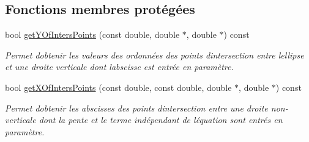 \subsection*{Fonctions membres protégées}
\begin{DoxyCompactItemize}
\item 
bool \hyperlink{classEllipse_a00f04c68837ae5b89049074821576458}{get\+Y\+Of\+Inters\+Points} (const double, double $\ast$, double $\ast$) const 
\begin{DoxyCompactList}\small\item\em Permet d\textquotesingle{}obtenir les valeurs des ordonnées des points d\textquotesingle{}intersection entre l\textquotesingle{}ellipse et une droite verticale dont l\textquotesingle{}abscisse est entrée en paramètre. \end{DoxyCompactList}\item 
bool \hyperlink{classEllipse_ab1aac4ab1ea77795131ea2644963910b}{get\+X\+Of\+Inters\+Points} (const double, const double, double $\ast$, double $\ast$) const 
\begin{DoxyCompactList}\small\item\em Permet d\textquotesingle{}obtenir les abscisses des points d\textquotesingle{}intersection entre une droite non-\/verticale dont la pente et le terme indépendant de l\textquotesingle{}équation sont entrés en paramètre. \end{DoxyCompactList}\end{DoxyCompactItemize}
